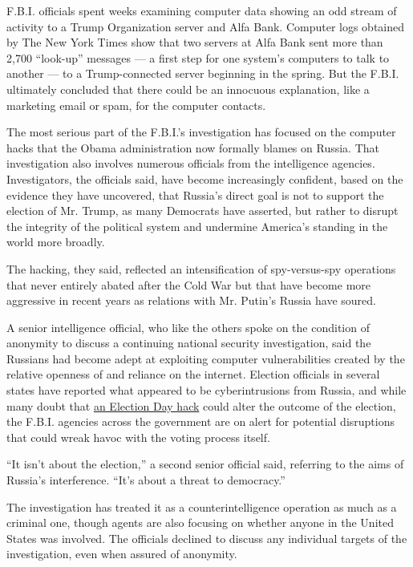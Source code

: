 F.B.I. officials spent weeks examining computer data showing an odd
stream of activity to a Trump Organization server and Alfa Bank.
Computer logs obtained by The New York Times show that two servers at
Alfa Bank sent more than 2,700 ``look-up'' messages --- a first step for
one system's computers to talk to another --- to a Trump-connected
server beginning in the spring. But the F.B.I. ultimately concluded that
there could be an innocuous explanation, like a marketing email or spam,
for the computer contacts.

The most serious part of the F.B.I.'s investigation has focused on the
computer hacks that the Obama administration now formally blames on
Russia. That investigation also involves numerous officials from the
intelligence agencies. Investigators, the officials said, have become
increasingly confident, based on the evidence they have uncovered, that
Russia's direct goal is not to support the election of Mr. Trump, as
many Democrats have asserted, but rather to disrupt the integrity of the
political system and undermine America's standing in the world more
broadly.

The hacking, they said, reflected an intensification of spy-versus-spy
operations that never entirely abated after the Cold War but that have
become more aggressive in recent years as relations with Mr. Putin's
Russia have soured.

A senior intelligence official, who like the others spoke on the
condition of anonymity to discuss a continuing national security
investigation, said the Russians had become adept at exploiting computer
vulnerabilities created by the relative openness of and reliance on the
internet. Election officials in several states have reported what
appeared to be cyberintrusions from Russia, and while many doubt that
\href{http://www.nytimes.com/2016/09/15/us/politics/sowing-doubt-is-seen-as-prime-danger-in-hacking-voting-system.html}{an
Election Day hack} could alter the outcome of the election, the F.B.I.
agencies across the government are on alert for potential disruptions
that could wreak havoc with the voting process itself.

``It isn't about the election,'' a second senior official said,
referring to the aims of Russia's interference. ``It's about a threat to
democracy.''

The investigation has treated it as a counterintelligence operation as
much as a criminal one, though agents are also focusing on whether
anyone in the United States was involved. The officials declined to
discuss any individual targets of the investigation, even when assured
of anonymity.

